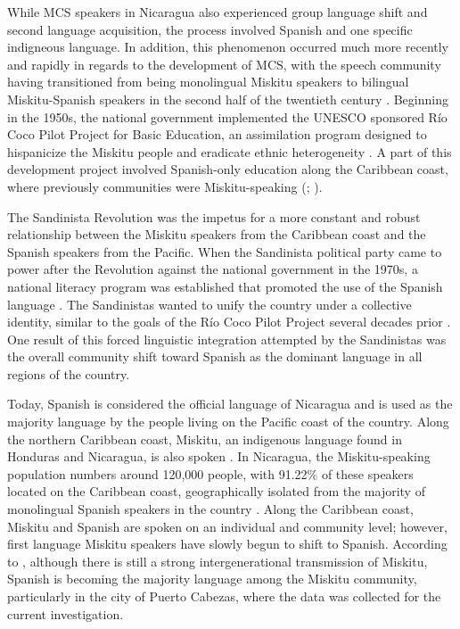 \documentclass[output=paper,colorlinks,citecolor=brown,
]{langscibook}
\begin{document}
While MCS speakers in Nicaragua also experienced group language shift and second language acquisition, the process involved Spanish and one specific indigneous language. In addition, this phenomenon occurred much more recently and rapidly in regards to the development of MCS, with the speech community having transitioned from being monolingual Miskitu speakers to bilingual Miskitu-Spanish speakers in the second half of the twentieth century \citep[99]{garcia1996making}. Beginning in the 1950s, the national government implemented the UNESCO sponsored Río Coco Pilot Project for Basic Education, an assimilation program designed to hispanicize the Miskitu people and eradicate ethnic heterogeneity \citep[205--207]{meringer2014accommodating}. A part of this development project involved Spanish-only education along the Caribbean coast, where previously communities were Miskitu-speaking (\citealt[99]{garcia1996making}; \citealt[208]{meringer2014accommodating}). 

The Sandinista Revolution was the impetus for a more constant and robust relationship between the Miskitu speakers from the Caribbean coast and the Spanish speakers from the Pacific. When the Sandinista political party came to power after the Revolution against the national government in the 1970s, a national literacy program was established that promoted the use of the Spanish language \citep[732]{escobar2013}. The Sandinistas wanted to unify the country under a collective identity, similar to the goals of the Río Coco Pilot Project several decades prior \citep[104]{garcia1996making}. One result of this forced linguistic integration attempted by the Sandinistas was the overall community shift toward Spanish as the dominant language in all regions of the country. 

Today, Spanish is considered the official language of Nicaragua and is used as the majority language by the people living on the Pacific coast of the country. Along the northern Caribbean coast, Miskitu, an indigenous language found in Honduras and Nicaragua, is also spoken \citep[721]{catter2011intercultural}. In Nicaragua, the Miskitu-speaking population numbers around 120,000 people, with 91.22\% of these speakers located on the Caribbean coast, geographically isolated from the majority of monolingual Spanish speakers in the country \citep[12]{wilson2012sari}. Along the Caribbean coast, Miskitu and Spanish are spoken on an individual and community level; however, first language Miskitu speakers have slowly begun to shift to Spanish. According to \citet[12--14]{wilson2012sari}, although there is still a strong intergenerational transmission of Miskitu, Spanish is becoming the majority language among the Miskitu community, particularly in the city of Puerto Cabezas, where the data was collected for the current investigation. 
\end{document}
